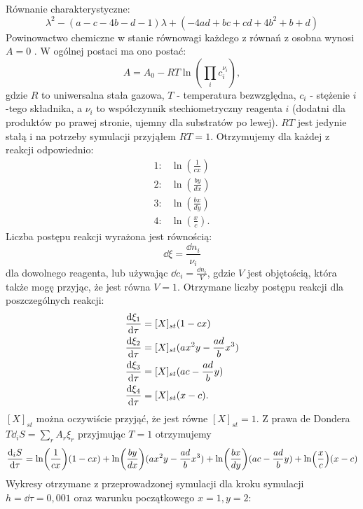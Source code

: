 \documentclass[10pt, a4paper, twoside, onecolumn]{article}
\numberwithin{equation}{section}
\begin{document}
	Równanie charakterystyczne:
	\begin{equation}
		\lambda^{2} - (a - c - 4b - d - 1)\lambda + (-4ad + bc + cd + 4b^{2} + b + d)
	\end{equation}
	Powinowactwo chemiczne w stanie równowagi każdego z równań z osobna wynosi \(A=0\) \cite{pigon1}. W ogólnej postaci ma ono postać:
	\begin{equation}
		A = A_{0} - RT\ln(\prod_{i}c_{i}^{\nu_{i}}), 
	\end{equation}
	gdzie \(R\) to uniwersalna stała gazowa, \(T\) - temperatura bezwzględna, \(c_{i}\) - stężenie \(i\)-tego składnika, a \(\nu_{i}\) to współczynnik stechiometryczny reagenta \(i\) (dodatni dla produktów po prawej stronie, ujemny dla substratów po lewej). \(RT\) jest jedynie stałą i na potrzeby symulacji przyjąłem \(RT=1\). Otrzymujemy dla każdej z reakcji odpowiednio:
	\begin{align}
		1: & \ln(\frac{1}{cx}) \\
		2: & \ln(\frac{by}{dx}) \\
		3: & \ln(\frac{bx}{dy}) \\
		4: & \ln(\frac{x}{c}).
	\end{align}
	Liczba postępu reakcji wyrażona jest równością: 
	\begin{equation}
		\dd{\xi} = \frac{\dd{n_{i}}}{\nu_{i}}
	\end{equation}
	dla dowolnego reagenta, lub używając \(\dd{c_{i}} = \frac{\dd{n_{i}}}{V}\), gdzie \(V\) jest objętością, która także mogę przyjąc, że jest równa \(V=1\). Otrzymane liczby postępu reakcji dla poszczególnych reakcji:
	\begin{align}
		\dv{\xi_{1}}{\tau} &= [X]_{st}(1 - cx) \\
		\dv{\xi_{2}}{\tau} &= [X]_{st}(ax^{2}y - \frac{ad}{b}x^{3}) \\
		\dv{\xi_{3}}{\tau} &= [X]_{st}(ac - \frac{ad}{b}y) \\
		\dv{\xi_{4}}{\tau} &= [X]_{st}(x - c).
	\end{align}
	\([X]_{st}\) można oczywiście przyjąć, że jest równe \([X]_{st}=1\). Z prawa de Dondera \(T\dd_{i}S=\sum_{r}A_{r}\xi_{r}\) przyjmując \(T=1\) otrzymujemy
	\begin{equation}
		\dv{_{i}S}{\tau} = \ln(\frac{1}{cx})(1 - cx) + \ln(\frac{by}{dx})(ax^{2}y - \frac{ad}{b}x^{3}) + \ln(\frac{bx}{dy})(ac - \frac{ad}{b}y) + \ln(\frac{x}{c})(x - c)
	\end{equation}
	Wykresy otrzymane z przeprowadzonej symulacji dla kroku symulacji \(h = \dd{\tau} = 0,001\) oraz warunku początkowego \(x=1, y=2\):
\end{document}
